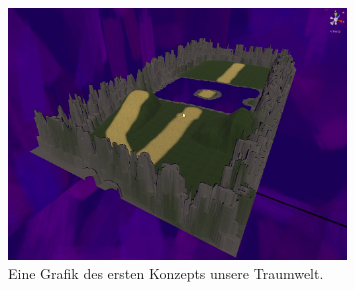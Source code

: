 \begin{figure}[H]
    \centering
    \includegraphics[width=0.8\textwidth]{chapters/15/images/Dreamworld.png}
    \caption{Eine Grafik des ersten Konzepts unsere Traumwelt.}
    \label{UST-7}
\end{figure}

